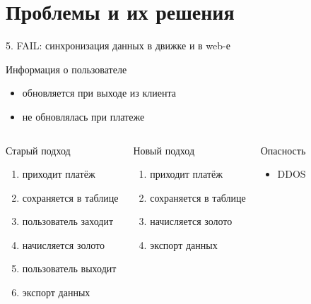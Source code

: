 \documentclass{beamer}
\begin{document}
\section{Проблемы и их решения}
\begin{frame}{5. FAIL: синхронизация данных в движке и в web-е}
    \begin{block}{Информация о пользователе}
        \begin{itemize}
            \item{обновляется при выходе из клиента}
            \item{не обновлялась при платеже}
        \end{itemize}
    \end{block}
    
    \begin{columns}
        \pause
            \begin{block}{Старый подход}
                \begin{enumerate}
                    \item{приходит платёж}
                    \item{сохраняется в таблице}
                    \item{пользователь заходит}
                    \item{начисляется золото}
                    \item{пользователь выходит}
                    \item{экспорт данных}
                \end{enumerate}
            \end{block}

            \pause
            \begin{block}{Новый подход}
                 \begin{enumerate}
                    \item{приходит платёж}
                    \item{сохраняется в таблице}
                    \item{начисляется золото}
                    \item{экспорт данных}
                \end{enumerate}
             \end{block}

            \pause
            \begin{block}{Опасность}
                \begin{itemize}
                    \item{DDOS}
                \end{itemize}
            \end{block}
    \end{columns}
\end{frame}
\end{document}
